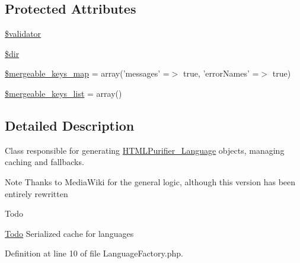 \subsection*{Protected Attributes}
\begin{DoxyCompactItemize}
\item 
\hyperlink{classHTMLPurifier__LanguageFactory_adc75fa793689675394f89fd920804105}{\$validator}
\item 
\hyperlink{classHTMLPurifier__LanguageFactory_a741f65f44cddbeb9a1ef54fedf8e2a89}{\$dir}
\item 
\hyperlink{classHTMLPurifier__LanguageFactory_a52e2d6740f4e7411697bad9f85e95892}{\$mergeable\+\_\+keys\+\_\+map} = array('messages' =$>$ true, 'error\+Names' =$>$ true)
\item 
\hyperlink{classHTMLPurifier__LanguageFactory_a9901a43e75cef050c89b117a10800843}{\$mergeable\+\_\+keys\+\_\+list} = array()
\end{DoxyCompactItemize}


\subsection{Detailed Description}
Class responsible for generating \hyperlink{classHTMLPurifier__Language}{H\+T\+M\+L\+Purifier\+\_\+\+Language} objects, managing caching and fallbacks. \begin{DoxyNote}{Note}
Thanks to Media\+Wiki for the general logic, although this version has been entirely rewritten 
\end{DoxyNote}
\begin{DoxyRefDesc}{Todo}
\item[\hyperlink{todo__todo000026}{Todo}]Serialized cache for languages \end{DoxyRefDesc}


Definition at line 10 of file Language\+Factory.\+php.



